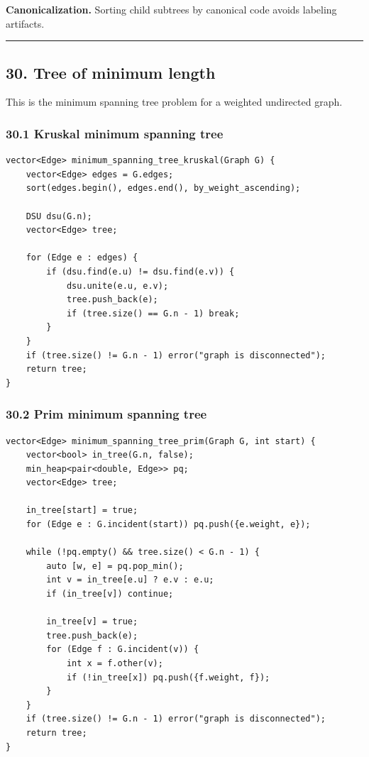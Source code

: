 \documentclass[11pt]{article}
\begin{document}
\textbf{Canonicalization.} Sorting child subtrees by canonical code avoids labeling artifacts.

\begin{center}\rule{0.5\linewidth}{0.5pt}\end{center}

\subsection{30. Tree of minimum length}\label{tree-of-minimum-length}

This is the minimum spanning tree problem for a weighted undirected graph.

\subsubsection{30.1 Kruskal minimum spanning tree}\label{kruskal-minimum-spanning-tree}

\begin{verbatim}
vector<Edge> minimum_spanning_tree_kruskal(Graph G) {
    vector<Edge> edges = G.edges;
    sort(edges.begin(), edges.end(), by_weight_ascending);

    DSU dsu(G.n);
    vector<Edge> tree;

    for (Edge e : edges) {
        if (dsu.find(e.u) != dsu.find(e.v)) {
            dsu.unite(e.u, e.v);
            tree.push_back(e);
            if (tree.size() == G.n - 1) break;
        }
    }
    if (tree.size() != G.n - 1) error("graph is disconnected");
    return tree;
}
\end{verbatim}

\subsubsection{30.2 Prim minimum spanning tree}\label{prim-minimum-spanning-tree}

\begin{verbatim}
vector<Edge> minimum_spanning_tree_prim(Graph G, int start) {
    vector<bool> in_tree(G.n, false);
    min_heap<pair<double, Edge>> pq;
    vector<Edge> tree;

    in_tree[start] = true;
    for (Edge e : G.incident(start)) pq.push({e.weight, e});

    while (!pq.empty() && tree.size() < G.n - 1) {
        auto [w, e] = pq.pop_min();
        int v = in_tree[e.u] ? e.v : e.u;
        if (in_tree[v]) continue;

        in_tree[v] = true;
        tree.push_back(e);
        for (Edge f : G.incident(v)) {
            int x = f.other(v);
            if (!in_tree[x]) pq.push({f.weight, f});
        }
    }
    if (tree.size() != G.n - 1) error("graph is disconnected");
    return tree;
}
\end{verbatim}
\end{document}
